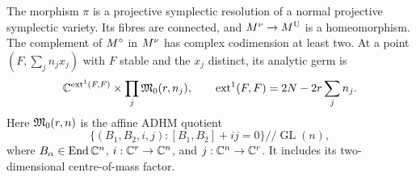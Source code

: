 \begin{proposition}\label{prop:algebraic-model}
The morphism $\pi$ is a projective symplectic resolution of a normal
projective symplectic variety. Its fibres are connected, and
$M^{\nu}\to M^{\mathrm U}$ is a homeomorphism. The complement of $M^{\circ}$ in $M^{\nu}$ has
complex codimension at least two.
At a point $(F,\sum_jn_jx_j)$ with $F$ stable and the $x_j$ distinct, its
analytic germ is
\begin{equation}\label{eq:adhm-germ}
 \mathbb C^{\operatorname{ext}^1(F,F)}\times\prod_j\mathfrak M_0(r,n_j),
 \qquad \operatorname{ext}^1(F,F)=2N-2r\sum_jn_j.
\end{equation}
Here $\mathfrak M_0(r,n)$ is the affine ADHM quotient
\begin{equation}\label{eq:adhm-definition}
 \{(B_1,B_2,i,j):[B_1,B_2]+ij=0\}\mathbin{/\!/}\operatorname{GL}(n),
\end{equation}
where $B_\alpha\in\operatorname{End}\mathbb C^n$, $i:\mathbb C^r\to\mathbb C^n$, and
$j:\mathbb C^n\to\mathbb C^r$. It includes its two-dimensional centre-of-mass factor.
\end{proposition}
